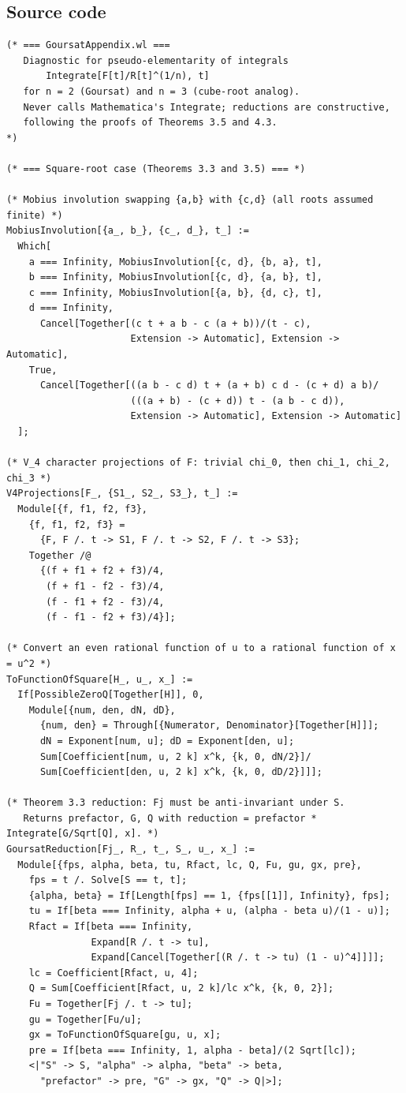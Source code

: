 \documentclass[11pt,a4paper]{article}
\theoremstyle{plain}
\theoremstyle{definition}
\theoremstyle{remark}
\begin{document}
\subsection*{Source code}

\begin{lstlisting}
(* === GoursatAppendix.wl ===
   Diagnostic for pseudo-elementarity of integrals
       Integrate[F[t]/R[t]^(1/n), t]
   for n = 2 (Goursat) and n = 3 (cube-root analog).
   Never calls Mathematica's Integrate; reductions are constructive,
   following the proofs of Theorems 3.5 and 4.3.
*)

(* === Square-root case (Theorems 3.3 and 3.5) === *)

(* Mobius involution swapping {a,b} with {c,d} (all roots assumed finite) *)
MobiusInvolution[{a_, b_}, {c_, d_}, t_] :=
  Which[
    a === Infinity, MobiusInvolution[{c, d}, {b, a}, t],
    b === Infinity, MobiusInvolution[{c, d}, {a, b}, t],
    c === Infinity, MobiusInvolution[{a, b}, {d, c}, t],
    d === Infinity,
      Cancel[Together[(c t + a b - c (a + b))/(t - c),
                      Extension -> Automatic], Extension -> Automatic],
    True,
      Cancel[Together[((a b - c d) t + (a + b) c d - (c + d) a b)/
                      (((a + b) - (c + d)) t - (a b - c d)),
                      Extension -> Automatic], Extension -> Automatic]
  ];

(* V_4 character projections of F: trivial chi_0, then chi_1, chi_2, chi_3 *)
V4Projections[F_, {S1_, S2_, S3_}, t_] :=
  Module[{f, f1, f2, f3},
    {f, f1, f2, f3} =
      {F, F /. t -> S1, F /. t -> S2, F /. t -> S3};
    Together /@
      {(f + f1 + f2 + f3)/4,
       (f + f1 - f2 - f3)/4,
       (f - f1 + f2 - f3)/4,
       (f - f1 - f2 + f3)/4}];

(* Convert an even rational function of u to a rational function of x = u^2 *)
ToFunctionOfSquare[H_, u_, x_] :=
  If[PossibleZeroQ[Together[H]], 0,
    Module[{num, den, dN, dD},
      {num, den} = Through[{Numerator, Denominator}[Together[H]]];
      dN = Exponent[num, u]; dD = Exponent[den, u];
      Sum[Coefficient[num, u, 2 k] x^k, {k, 0, dN/2}]/
      Sum[Coefficient[den, u, 2 k] x^k, {k, 0, dD/2}]]];

(* Theorem 3.3 reduction: Fj must be anti-invariant under S.
   Returns prefactor, G, Q with reduction = prefactor * Integrate[G/Sqrt[Q], x]. *)
GoursatReduction[Fj_, R_, t_, S_, u_, x_] :=
  Module[{fps, alpha, beta, tu, Rfact, lc, Q, Fu, gu, gx, pre},
    fps = t /. Solve[S == t, t];
    {alpha, beta} = If[Length[fps] == 1, {fps[[1]], Infinity}, fps];
    tu = If[beta === Infinity, alpha + u, (alpha - beta u)/(1 - u)];
    Rfact = If[beta === Infinity,
               Expand[R /. t -> tu],
               Expand[Cancel[Together[(R /. t -> tu) (1 - u)^4]]]];
    lc = Coefficient[Rfact, u, 4];
    Q = Sum[Coefficient[Rfact, u, 2 k]/lc x^k, {k, 0, 2}];
    Fu = Together[Fj /. t -> tu];
    gu = Together[Fu/u];
    gx = ToFunctionOfSquare[gu, u, x];
    pre = If[beta === Infinity, 1, alpha - beta]/(2 Sqrt[lc]);
    <|"S" -> S, "alpha" -> alpha, "beta" -> beta,
      "prefactor" -> pre, "G" -> gx, "Q" -> Q|>];


\end{lstlisting}
\end{document}
